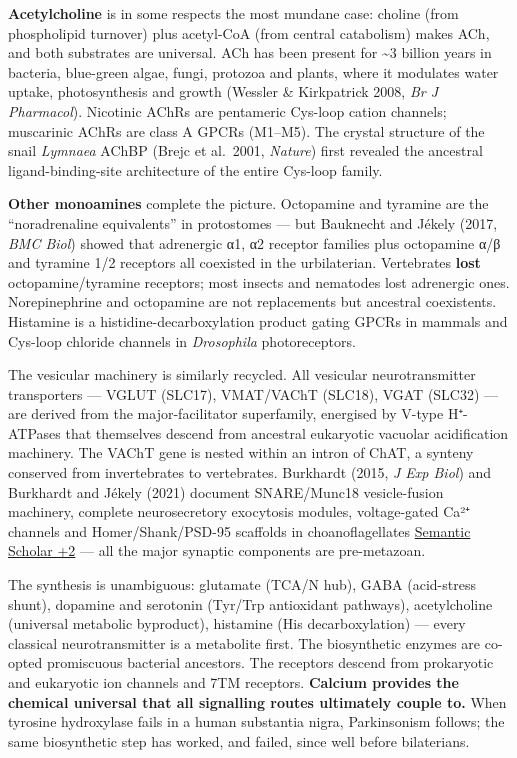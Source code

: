 \textbf{Acetylcholine} is in some respects the most mundane case: choline (from phospholipid turnover) plus acetyl-CoA (from central catabolism) makes ACh, and both substrates are universal. ACh has been present for \textasciitilde3 billion years in bacteria, blue-green algae, fungi, protozoa and plants, where it modulates water uptake, photosynthesis and growth (Wessler \& Kirkpatrick 2008, \emph{Br J Pharmacol}). Nicotinic AChRs are pentameric Cys-loop cation channels; muscarinic AChRs are class A GPCRs (M1--M5). The crystal structure of the snail \emph{Lymnaea} AChBP (Brejc et al.~2001, \emph{Nature}) first revealed the ancestral ligand-binding-site architecture of the entire Cys-loop family.

\textbf{Other monoamines} complete the picture. Octopamine and tyramine are the ``noradrenaline equivalents'' in protostomes --- but Bauknecht and Jékely (2017, \emph{BMC Biol}) showed that adrenergic α1, α2 receptor families plus octopamine α/β and tyramine 1/2 receptors all coexisted in the urbilaterian. Vertebrates \textbf{lost} octopamine/tyramine receptors; most insects and nematodes lost adrenergic ones. Norepinephrine and octopamine are not replacements but ancestral coexistents. Histamine is a histidine-decarboxylation product gating GPCRs in mammals and Cys-loop chloride channels in \emph{Drosophila} photoreceptors.

The vesicular machinery is similarly recycled. All vesicular neurotransmitter transporters --- VGLUT (SLC17), VMAT/VAChT (SLC18), VGAT (SLC32) --- are derived from the major-facilitator superfamily, energised by V-type H⁺-ATPases that themselves descend from ancestral eukaryotic vacuolar acidification machinery. The VAChT gene is nested within an intron of ChAT, a synteny conserved from invertebrates to vertebrates. Burkhardt (2015, \emph{J Exp Biol}) and Burkhardt and Jékely (2021) document SNARE/Munc18 vesicle-fusion machinery, complete neurosecretory exocytosis modules, voltage-gated Ca²⁺ channels and Homer/Shank/PSD-95 scaffolds in choanoflagellates \href{https://www.semanticscholar.org/paper/The-origin-and-evolution-of-synaptic-proteins-lead-Burkhardt/296eb4866f003b9b1ce6882845cc87f265606057}{Semantic Scholar +2} --- all the major synaptic components are pre-metazoan.

The synthesis is unambiguous: glutamate (TCA/N hub), GABA (acid-stress shunt), dopamine and serotonin (Tyr/Trp antioxidant pathways), acetylcholine (universal metabolic byproduct), histamine (His decarboxylation) --- every classical neurotransmitter is a metabolite first. The biosynthetic enzymes are co-opted promiscuous bacterial ancestors. The receptors descend from prokaryotic and eukaryotic ion channels and 7TM receptors. \textbf{Calcium provides the chemical universal that all signalling routes ultimately couple to.} When tyrosine hydroxylase fails in a human substantia nigra, Parkinsonism follows; the same biosynthetic step has worked, and failed, since well before bilaterians.

